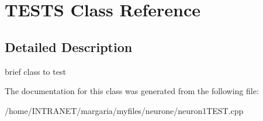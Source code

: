 \hypertarget{classTESTS}{\section{T\-E\-S\-T\-S Class Reference}
\label{classTESTS}
}


\subsection{Detailed Description}
brief class to test 

The documentation for this class was generated from the following file\-:\begin{DoxyCompactItemize}
\item 
/home/\-I\-N\-T\-R\-A\-N\-E\-T/margaria/myfiles/neurone/neuron1\-T\-E\-S\-T.\-cpp\end{DoxyCompactItemize}
